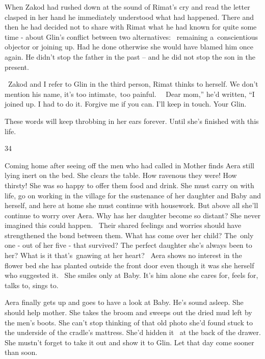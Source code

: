 \documentclass[letterpaper]{article}
\begin{document}
When\textcolor{red}{ }Zakod had rushed down at the sound of Rimat's cry and read the letter clasped in her hand he
immediately understood what had happened. There and then he had decided\textcolor{red}{ }not to share with Rimat what
he had known for quite some time - about Glin's conflict between two alternatives: ~remaining a~conscientious objector
or joining up. Had he done otherwise she would have blamed him once again. He didn't stop the father in the past -- and
he did not stop the son in the present.

~Zakod and I refer to Glin in the third person, Rimat thinks to herself. We don't mention his name, it's too
intimate,~too painful. \ \ {\textquotedbl}Dear mom,'' he'd written, ``I joined up. I had to do it. Forgive me if you
can. I'll keep in touch. Your Glin.{\textquotedbl} 

These words will keep throbbing in her ears forever. Until she's finished with this life.


\bigskip

34 

Coming home after seeing off the men who had called in Mother finds Aera still lying inert on the bed. She clears the
table. How ravenous they were! How thirsty! She was so happy to offer them food and drink. She must carry on with life,
go on working in the village for the sustenance of her daughter and Baby\textbf{ }and herself, and here at home she
must continue with housework.\textcolor{red}{ }But above all she'll continue to worry over Aera. Why has her daughter
become so distant? She never imagined this could happen. ~Their shared feelings and worries should have strengthened
the bond between them. What has come over her child? The~only one - out of her five - that survived? The perfect
daughter she's always been to her? What is it that's~gnawing at her heart? ~Aera shows no interest in the flower bed
she has planted outside the front door even though it was she herself who suggested it. ~She smiles only at Baby. It's
him alone she cares for, feels for, talks to, sings to.

Aera finally gets up and goes to have a look at Baby. He's sound asleep. She should help mother. She takes the broom and
sweeps out the dried mud left by the men's boots. She can't stop thinking of that old photo she'd found stuck
to\textcolor{red}{ }the underside of the cradle's mattress. She'd hidden it \ at the back of the drawer. She mustn't
forget to take it out and show it to Glin. Let that day come sooner than soon. 
\end{document}
